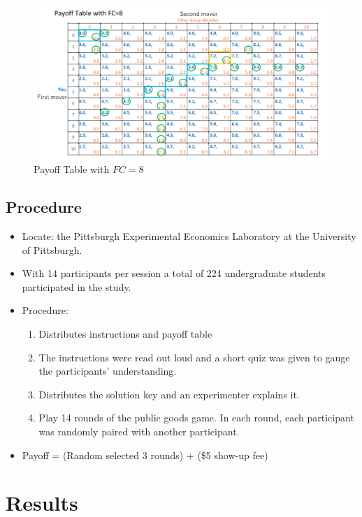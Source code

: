 \documentclass[../root]{subfiles}
\begin{document}
    \begin{figure}[H]
        \centering
        \includegraphics[width = 16cm]{0605kato/payoff_FC8.png}
        \caption{Payoff Table with $FC = 8$}
        \label{payoff FC8}
    \end{figure}

    \subsection{Procedure}

    \begin{itemize}
        \item Locate: the Pittsburgh Experimental Economics Laboratory at the University of Pittsburgh.
        \item With 14 participants per session a total of 224 undergraduate students participated in the study.
        \item Procedure:
        \begin{enumerate}
            \item Distributes instructions and payoff table
            \item The instructions were read out loud and a short quiz was given to gauge the participants' understanding.
            \item Distributes the solution key and an experimenter explains it.
            \item Play 14 rounds of the public goods game. In each round, each participant was randomly paired with another participant.
        \end{enumerate}
        \item Payoff = (Random selected 3 rounds) + (\$5 show-up fee)
    \end{itemize}

    
    \section{Results}
\end{document}
